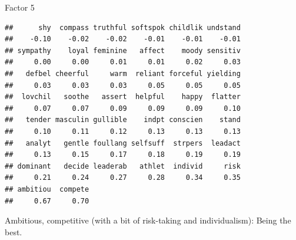 \begin{frame}[fragile]{Factor 5}
  
  {\footnotesize
\begin{knitrout}
\color{fgcolor}\begin{kframe}
\begin{alltt}
\hlstd{mylist[[}\hlstd{]]}
\end{alltt}
\begin{verbatim}
##      shy  compass truthful softspok childlik undstand 
##    -0.10    -0.02    -0.02    -0.01    -0.01    -0.01 
## sympathy    loyal feminine   affect    moody sensitiv 
##     0.00     0.00     0.01     0.01     0.02     0.03 
##   defbel cheerful     warm  reliant forceful yielding 
##     0.03     0.03     0.03     0.05     0.05     0.05 
##  lovchil   soothe   assert  helpful    happy  flatter 
##     0.07     0.07     0.09     0.09     0.09     0.10 
##   tender masculin gullible    indpt conscien    stand 
##     0.10     0.11     0.12     0.13     0.13     0.13 
##   analyt   gentle foullang selfsuff  strpers  leadact 
##     0.13     0.15     0.17     0.18     0.19     0.19 
## dominant   decide leaderab   athlet  individ     risk 
##     0.21     0.24     0.27     0.28     0.34     0.35 
## ambitiou  compete 
##     0.67     0.70
\end{verbatim}
\end{kframe}
\end{knitrout}
}

Ambitious, competitive (with a bit of risk-taking and individualism):
Being the best.

\end{frame}
